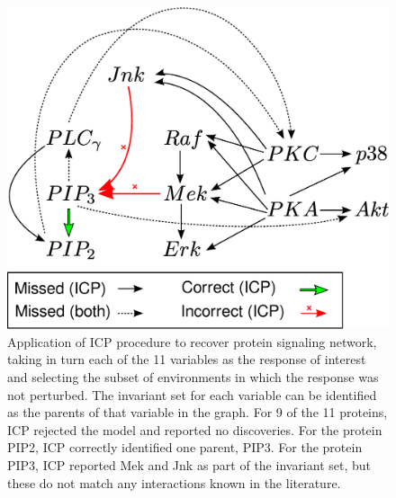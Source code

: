 \documentclass{article}
\begin{document}
\begin{figure}[t]
\centering
\includegraphics[scale = 0.3]{drawing2legend.eps}
\caption{\small Application of ICP procedure to recover protein signaling network,
taking in turn each of the 11 variables as the response of interest
and selecting the subset of environments in which the response was not
perturbed.  The invariant set for each variable can be identified as
the parents of that variable in the graph.  For 9 of the 11 proteins,
ICP rejected the model and reported no discoveries.  For the protein
PIP2, ICP correctly identified one parent, PIP3.  For the protein
PIP3, ICP reported Mek and Jnk as part of the invariant set, but these
do not match any interactions known in the literature.}
\label{fig:sachs}
\end{figure}




\end{document}
